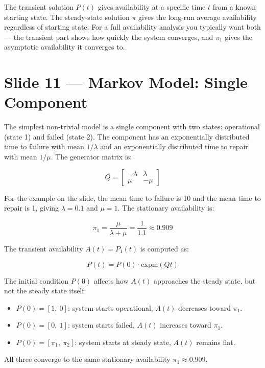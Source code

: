 \begin{keybox}
    The transient solution $P(t)$ gives availability at a specific 
    time $t$ from a known starting state. The steady-state solution 
    $\pi$ gives the long-run average availability regardless of starting 
    state. For a full availability analysis you typically want both --- 
    the transient part shows how quickly the system converges, and $\pi_1$ 
    gives the asymptotic availability it converges to.
\end{keybox}

\section*{Slide 11 — Markov Model: Single Component}

The simplest non-trivial model is a single component with two states: 
operational (state 1) and failed (state 2). The component has an 
exponentially distributed time to failure with mean $1/\lambda$ and 
an exponentially distributed time to repair with mean $1/\mu$. The 
generator matrix is:

\[
    Q = \begin{bmatrix} -\lambda & \lambda \\ \mu & -\mu \end{bmatrix}
\]

For the example on the slide, the mean time to failure is 10 and the 
mean time to repair is 1, giving $\lambda = 0.1$ and $\mu = 1$. The 
stationary availability is:

\[
    \pi_1 = \frac{\mu}{\lambda + \mu} = \frac{1}{1.1} \approx 0.909
\]

The transient availability $A(t) = P_1(t)$ is computed as:

\[
    P(t) = P(0) \cdot \mathrm{expm}(Qt)
\]

\begin{notebox}
    The initial condition $P(0)$ affects how $A(t)$ approaches the 
    steady state, but not the steady state itself:
    \begin{itemize}
        \item $P(0) = [1,\ 0]$: system starts operational, $A(t)$ 
        decreases toward $\pi_1$.
        \item $P(0) = [0,\ 1]$: system starts failed, $A(t)$ 
        increases toward $\pi_1$.
        \item $P(0) = [\pi_1,\ \pi_2]$: system starts at steady 
        state, $A(t)$ remains flat.
    \end{itemize}
    All three converge to the same stationary availability $\pi_1 
    \approx 0.909$.
\end{notebox}

